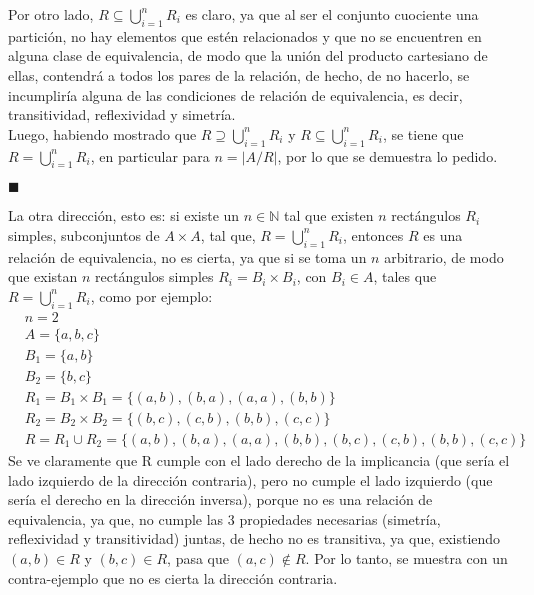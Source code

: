 \documentclass[letter]{article}
\begin{document}
\begin{pregunta}{1}
\begin{enumerate}
		Por otro lado, $R\subseteq\bigcup_{i=1}^{n}R_i$ es claro, ya que al ser el conjunto cuociente una partición, no hay elementos que estén relacionados y que no se encuentren en alguna clase de equivalencia, de modo que la unión del producto cartesiano de ellas, contendrá a todos los pares de la relación, de hecho, de no hacerlo, se incumpliría alguna de las condiciones de relación de equivalencia, es decir, transitividad, reflexividad y simetría.\\
		
		Luego, habiendo mostrado que $R\supseteq \bigcup_{i=1}^{n}R_i$ y $R\subseteq\bigcup_{i=1}^{n}R_i$, se tiene que $R=\bigcup_{i=1}^{n}R_i$, en particular para $n=|A/R|$, por lo que se demuestra lo pedido.
		\begin{flushright}$\blacksquare$\end{flushright}\pagebreak
		
		La otra dirección, esto es: si existe un $n \in \mathbb{N}$ tal que existen $n$ rectángulos $R_i$ simples, subconjuntos de $A \times A$, tal que, $R=\bigcup_{i=1}^{n}R_i$, entonces $R$ es una relación de equivalencia, no es cierta, ya que si se toma un $n$ arbitrario, de modo que existan $n$ rectángulos simples $R_i=B_i\times B_i$, con $B_i \in A$, tales que $R=\bigcup_{i=1}^{n}R_i$, como por ejemplo:
		\begin{align*}
			&n=2\\
			&A=\{a,b,c\}\\
			&B_1 = \{a,b\}\\
			&B_2 = \{b,c\}\\
			&R_1 = B_1 \times B_1 = \{(a, b), (b, a), (a, a), (b, b)\}\\
			&R_2 = B_2 \times B_2 = \{(b, c), (c, b), (b, b), (c, c)\}\\
			&R = R_1 \cup R_2 = \{(a, b), (b, a), (a, a), (b, b), (b, c), (c, b), (b, b), (c, c)\}
		\end{align*}
		Se ve claramente que R cumple con el lado derecho de la implicancia (que sería el lado izquierdo de la dirección contraria), pero no cumple el lado izquierdo (que sería el derecho en la dirección inversa), porque no es una relación de equivalencia, ya que, no cumple las 3 propiedades necesarias (simetría, reflexividad y transitividad) juntas, de hecho no es transitiva, ya que, existiendo $(a,b) \in R$ y $(b,c) \in R$, pasa que $(a,c) \notin R$. Por lo tanto, se muestra con un contra-ejemplo que no es cierta la dirección contraria.
		
		
		
		\end{enumerate}
	\end{pregunta}
\end{document}
